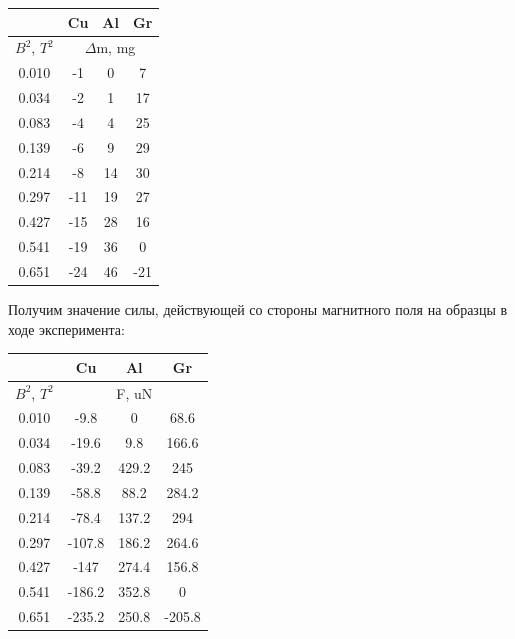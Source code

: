 \documentclass{article}
\begin{document}
    \begin{table}[H]
    \centering
    \begin{tabular}{|c|c|c|c|}
        \hline
        & Cu         & Al       & Gr                   \\\hline
    $B^2$, $T^2$& \multicolumn{3}{|c|}{$\Delta$m, mg}    \\\hline
        0.010   & -1         & 0        & 7       \\\hline
        0.034   & -2         & 1        & 17      \\\hline
        0.083   & -4         & 4        & 25      \\\hline
        0.139   & -6         & 9        & 29      \\\hline
        0.214   & -8         & 14       & 30      \\\hline
        0.297   & -11        & 19       & 27      \\\hline
        0.427   & -15        & 28       & 16      \\\hline
        0.541   & -19        & 36       & 0       \\\hline
        0.651   & -24        & 46       & -21     \\\hline
    \end{tabular} 
    \end{table}

    Получим значение силы, действующей со стороны магнитного поля на образцы в ходе эксперимента:

    \begin{table}[H]
        \centering
        \begin{tabular}{|c|c|c|c|}
            \hline
            & Cu         & Al       & Gr                       \\\hline
        $B^2$, $T^2$& \multicolumn{3}{|c|}{F, uN}              \\\hline
            0.010   & -9.8          & 0           & 68.6       \\\hline
            0.034   & -19.6         & 9.8         & 166.6      \\\hline
            0.083   & -39.2         & 429.2       & 245        \\\hline
            0.139   & -58.8         & 88.2        & 284.2      \\\hline
            0.214   & -78.4         & 137.2       & 294        \\\hline
            0.297   & -107.8        & 186.2       & 264.6      \\\hline
            0.427   & -147          & 274.4       & 156.8      \\\hline
            0.541   & -186.2        & 352.8       & 0          \\\hline
            0.651   & -235.2        & 250.8       & -205.8     \\\hline
        \end{tabular} 
        \end{table}
\end{document}
